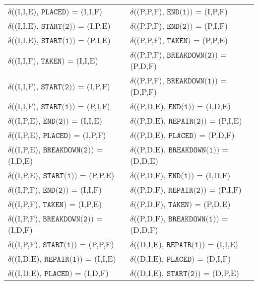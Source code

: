 \begin{table}[H]\centering
  \begin{tabular}{ll}
    $\delta$((I,I,E), $\texttt{PLACED})$ = (I,I,F)       & $\delta$((P,P,F), $\texttt{END(1)})$ = (I,P,F)       \\
    $\delta$((I,I,E), $\texttt{START(2)})$ = (I,P,E)     & $\delta$((P,P,F), $\texttt{END(2)})$ = (P,I,F)       \\
    $\delta$((I,I,E), $\texttt{START(1)})$ = (P,I,E)     & $\delta$((P,P,F), $\texttt{TAKEN})$ = (P,P,E)        \\
    $\delta$((I,I,F), $\texttt{TAKEN})$ = (I,I,E)        & $\delta$((P,P,F), $\texttt{BREAKDOWN(2)})$ = (P,D,F) \\
    $\delta$((I,I,F), $\texttt{START(2)})$ = (I,P,F)     & $\delta$((P,P,F), $\texttt{BREAKDOWN(1)})$ = (D,P,F) \\
    $\delta$((I,I,F), $\texttt{START(1)})$ = (P,I,F)     & $\delta$((P,D,E), $\texttt{END(1)})$ = (I,D,E)       \\
    $\delta$((I,P,E), $\texttt{END(2)})$ = (I,I,E)       & $\delta$((P,D,E), $\texttt{REPAIR(2)})$ = (P,I,E)    \\
    $\delta$((I,P,E), $\texttt{PLACED})$ = (I,P,F)       & $\delta$((P,D,E), $\texttt{PLACED})$ = (P,D,F)       \\
    $\delta$((I,P,E), $\texttt{BREAKDOWN(2)})$ = (I,D,E) & $\delta$((P,D,E), $\texttt{BREAKDOWN(1)})$ = (D,D,E) \\
    $\delta$((I,P,E), $\texttt{START(1)})$ = (P,P,E)     & $\delta$((P,D,F), $\texttt{END(1)})$ = (I,D,F)       \\
    $\delta$((I,P,F), $\texttt{END(2)})$ = (I,I,F)       & $\delta$((P,D,F), $\texttt{REPAIR(2)})$ = (P,I,F)    \\
    $\delta$((I,P,F), $\texttt{TAKEN})$ = (I,P,E)        & $\delta$((P,D,F), $\texttt{TAKEN})$ = (P,D,E)         \\
    $\delta$((I,P,F), $\texttt{BREAKDOWN(2)})$ = (I,D,F) & $\delta$((P,D,F), $\texttt{BREAKDOWN(1)})$ = (D,D,F)  \\
    $\delta$((I,P,F), $\texttt{START(1)})$ = (P,P,F)     & $\delta$((D,I,E), $\texttt{REPAIR(1)})$ = (I,I,E)     \\
    $\delta$((I,D,E), $\texttt{REPAIR(1)})$ = (I,I,E)    & $\delta$((D,I,E), $\texttt{PLACED})$ = (D,I,F)        \\
    $\delta$((I,D,E), $\texttt{PLACED})$ = (I,D,F)       & $\delta$((D,I,E), $\texttt{START(2)})$ = (D,P,E)      \\

\end{tabular}
\end{table}
